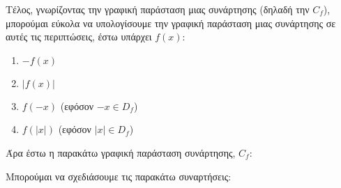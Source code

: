 Τέλος, γνωρίζοντας την γραφική παράσταση μιας συνάρτησης (δηλαδή την $C_{f}$), μπορούμαι εύκολα να υπολογίσουμε την γραφική παράσταση μιας συνάρτησης σε αυτές τις περιπτώσεις, έστω υπάρχει $f(x)$:
\begin{enumerate}
 \item $-f(x)$
 \item $\vert f(x) \vert$
 \item $f(-x)$ (εφόσον $-x \in D_{f}$)
 \item $f(\vert x\vert)$ (εφόσον $\vert x\vert \in D_{f}$)
\end{enumerate}

Άρα έστω η παρακάτω γραφική παράσταση συνάρτησης, $C_{f}$:

\begin{center}
\end{center}

Μπορούμαι να σχεδιάσουμε τις παρακάτω συναρτήσεις:

